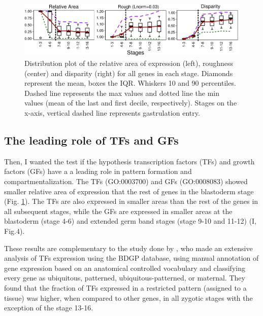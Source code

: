 \begin{figure}[h]
  \includegraphics[width=\textwidth]{./Images/Art-I/3_measures.png}
  \centering
  \caption{Distribution plot of the relative area of expression (left), roughness (center) and disparity (right) for all genes in each stage. Diamonds represent the mean, boxes the IQR. Whiskers 10 and 90 percentiles. Dashed line represents the max values and dotted line the min values (mean of the last and first decile, respectively). Stages on the x-axis, vertical dashed line represents gastrulation entry.}
  \label{fig:Art-I-3measures}
\end{figure}

\subsection{The leading role of TFs and GFs}

Then, I wanted the test if the hypothesis transcription factors (TFs) and growth factors (GFs) have a a leading role in pattern formation and compartmentalization.
The TFs (GO:0003700) and GFs (GO:0008083) showed smaller relative area of expression that the rest of genes in the blastoderm stage (Fig. \ref{fig:Art-I-3measures}).
%
The TFs are also expressed in smaller areas than the rest of the genes in all subsequent stages, while the GFs are expressed in smaller areas at the blastoderm (stage 4-6) and extended germ band stages (stage 9-10 and 11-12) (I, Fig.4).

These results are complementary to the study done by \citet{Hammonds2013}, who made an extensive analysis of TFs expression using the BDGP database, using manual annotation of gene expression based on an anatomical controlled vocabulary and classifying every gene as ubiquitous, patterned, ubiquitous-patterned, or maternal. 
They found that the fraction of TFs expressed in a restricted pattern (assigned to a tissue) was higher, when compared to other genes, in all zygotic stages with the exception of the stage 13-16. 

